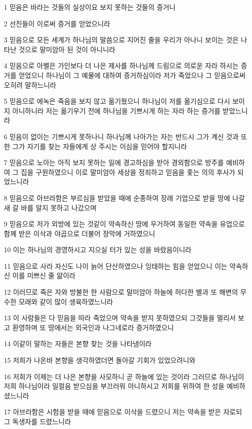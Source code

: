\par 1 믿음은 바라는 것들의 실상이요 보지 못하는 것들의 증거니
\par 2 선진들이 이로써 증거를 얻었으니라
\par 3 믿음으로 모든 세계가 하나님의 말씀으로 지어진 줄을 우리가 아나니 보이는 것은 나타난 것으로 말미암아 된 것이 아니니라
\par 4 믿음으로 아벨은 가인보다 더 나은 제사를 하나님께 드림으로 의로운 자라 하시는 증거를 얻었으니 하나님이 그 예물에 대하여 증거하심이라 저가 죽었으나 그 믿음으로써 오히려 말하느니라
\par 5 믿음으로 에녹은 죽음을 보지 않고 옮기웠으니 하나님이 저를 옮기심으로 다시 보이지 아니하니라 저는 옮기우기 전에 하나님을 기쁘시게 하는 자라 하는 증거를 받았느니라
\par 6 믿음이 없이는 기쁘시게 못하나니 하나님께 나아가는 자는 반드시 그가 계신 것과 또한 그가 자기를 찾는 자들에게 상 주시는 이심을 믿어야 할지니라
\par 7 믿음으로 노아는 아직 보지 못하는 일에 경고하심을 받아 경외함으로 방주를 예비하여 그 집을 구원하였으니 이로 말미암아 세상을 정죄하고 믿음을 좇는 의의 후사가 되었느니라
\par 8 믿음으로 아브라함은 부르심을 받았을 때에 순종하여 장래 기업으로 받을 땅에 나갈새 갈 바를 알지 못하고 나갔으며
\par 9 믿음으로 저가 외방에 있는 것같이 약속하신 땅에 우거하여 동일한 약속을 유업으로 함께 받은 이삭과 야곱으로 더불어 장막에 거하였으니
\par 10 이는 하나님의 경영하시고 지으실 터가 있는 성을 바랐음이니라
\par 11 믿음으로 사라 자신도 나이 늙어 단산하였으나 잉태하는 힘을 얻었으니 이는 약속하신 이를 미쁘신 줄 앎이라
\par 12 이러므로 죽은 자와 방불한 한 사람으로 말미암아 하늘에 허다한 별과 또 해변의 무수한 모래와 같이 많이 생육하였느니라
\par 13 이 사람들은 다 믿음을 따라 죽었으며 약속을 받지 못하였으되 그것들을 멀리서 보고 환영하며 또 땅에서는 외국인과 나그네로라 증거하였으니
\par 14 이같이 말하는 자들은 본향 찾는 것을 나타냄이라
\par 15 저희가 나온바 본향을 생각하였더면 돌아갈 기회가 있었으려니와
\par 16 저희가 이제는 더 나은 본향을 사모하니 곧 하늘에 있는 것이라 그러므로 하나님이 저희 하나님이라 일컬음 받으심을 부끄러워 아니하시고 저희를 위하여 한 성을 예비하셨느니라
\par 17 아브라함은 시험을 받을 때에 믿음으로 이삭을 드렸으니 저는 약속을 받은 자로되 그 독생자를 드렸느니라
